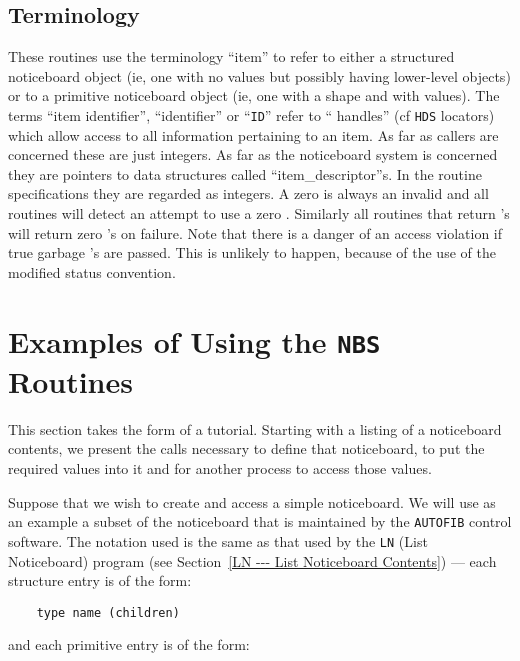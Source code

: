       \subsection {Terminology} These routines use the terminology ``item'' to
      refer to either a structured noticeboard object (ie, one with no values
      but possibly having lower-level objects) or to a primitive noticeboard
      object (ie, one with a shape and with values). The terms
      ``item identifier'', ``identifier'' or ``{\tt ID}'' refer to ``%
handles'' (cf {\tt HDS}
      locators) which allow access to all information pertaining to an item. As
      far as callers are concerned these are just integers. As far as the
      noticeboard system is concerned they are pointers to data structures
      called ``item\_descriptor''s. In the routine specifications they are
      regarded as integers. A zero {} is always an invalid {} and all routines
      will detect an attempt to use a zero {}. Similarly all %
routines that
      return {}'s will return zero {}'s on failure. Note %
that there is a danger
      of an access violation if true garbage {}'s are passed. This %
is unlikely
      to happen, because of the use of the modified status convention.


\section {Examples of Using the {\tt NBS} Routines}

This section takes the form of a tutorial. Starting with a listing of a
noticeboard contents, we present the calls necessary to define that
noticeboard, to put the required values into it and for another process to
access those values.

Suppose that we wish to create and access a simple noticeboard. We will
use as an example a subset of the noticeboard that is maintained by the
{\tt AUTOFIB} control software. The notation used is the same as that used by
the {\tt LN} (List Noticeboard) program (see Section~\ref {LN --- List
Noticeboard Contents}) --- each structure entry is of the form:

\begin {verbatim}
    type name (children)
\end{verbatim}

and each primitive entry is of the form:


